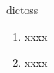 \begin{prework}{ dictoss }
  \begin{enumerate}
  \item xxxx
  \item xxxx
  \end{enumerate}
\end{prework}
